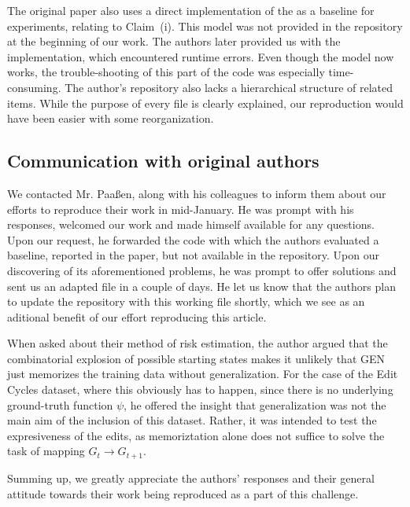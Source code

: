 The original paper also uses a direct implementation of the \cite{VGRNN} as a baseline for experiments, relating to \mbox{Claim (i).} This model was not provided in the repository at the beginning of our work. The authors later provided us with the implementation, which encountered runtime errors. Even though the model now works, the trouble-shooting of this part of the code was especially time-consuming. The author's repository also lacks a hierarchical structure of related items. While the purpose of every file is clearly explained, our reproduction would have been easier with some reorganization.



\subsection{Communication with original authors}

We contacted Mr. Paaßen, along with his colleagues to inform them about our efforts to reproduce their work in mid-January. He was prompt with his responses, welcomed our work and made himself available for any questions. Upon our request, he forwarded the code with which the authors evaluated a baseline, reported in the paper, but not available in the repository. Upon our discovering of its aforementioned problems, he was prompt to offer solutions and sent us an adapted file in a couple of days. He let us know that the authors plan to update the repository with this working file shortly, which we see as an aditional benefit of our effort reproducing this article.

When asked about their method of risk estimation, the author argued that the combinatorial explosion of possible starting states makes it unlikely that GEN just memorizes the training data without generalization. For the case of the Edit Cycles dataset, where this obviously has to happen, since there is no underlying ground-truth function $\psi$, he offered the insight that generalization was not the main aim of the inclusion of this dataset. Rather, it was intended to test the expresiveness of the edits, as memoriztation alone does not suffice to solve the task of mapping $G_{t} \to G_{t+1}$.

Summing up, we greatly appreciate the authors' responses and their general attitude towards their work being reproduced as a part of this challenge.



